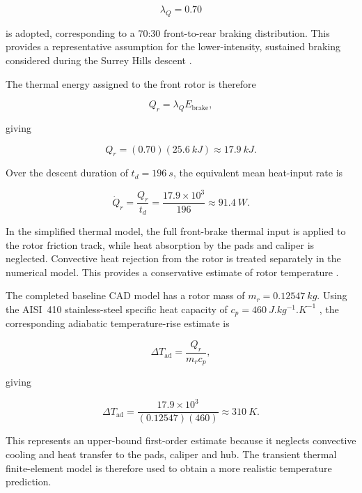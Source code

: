 \documentclass[11pt,a4paper]{article}
\begin{document}
\begin{equation}
    \lambda_Q = 0.70
\end{equation}

is adopted, corresponding to a 70:30 front-to-rear braking distribution.
This provides a representative assumption for the lower-intensity,
sustained braking considered during the Surrey Hills descent
\cite{MachadoViswanathan2023}.

The thermal energy assigned to the front rotor is therefore

\begin{equation}
    Q_r = \lambda_Q E_{\mathrm{brake}},
\end{equation}

giving

\begin{equation}
    Q_r
    =
    (0.70)(\SI{25.6}{kJ})
    \approx
    \SI{17.9}{kJ}.
\end{equation}

Over the descent duration of $t_d=\SI{196}{s}$, the equivalent mean
heat-input rate is

\begin{equation}
    \dot{Q}_r
    =
    \frac{Q_r}{t_d}
    =
    \frac{17.9\times10^3}{196}
    \approx
    \SI{91.4}{W}.
\end{equation}

In the simplified thermal model, the full front-brake thermal input is
applied to the rotor friction track, while heat absorption by the pads and
caliper is neglected. Convective heat rejection from the rotor is treated
separately in the numerical model. This provides a conservative estimate of
rotor temperature \cite{FeierRedfield2018}.

The completed baseline CAD model has a rotor mass of
$m_r=\SI{0.12547}{kg}$. Using the AISI~410 stainless-steel specific heat
capacity of $c_p=\SI{460}{J.kg^{-1}.K^{-1}}$ \cite{Atlas410}, the
corresponding adiabatic temperature-rise estimate is

\begin{equation}
    \Delta T_{\mathrm{ad}}
    =
    \frac{Q_r}{m_r c_p},
\end{equation}

giving

\begin{equation}
    \Delta T_{\mathrm{ad}}
    =
    \frac{17.9\times10^3}
         {(0.12547)(460)}
    \approx
    \SI{310}{K}.
\end{equation}

This represents an upper-bound first-order estimate because it neglects
convective cooling and heat transfer to the pads, caliper and hub. The
transient thermal finite-element model is therefore used to obtain a more
realistic temperature prediction.
\end{document}
